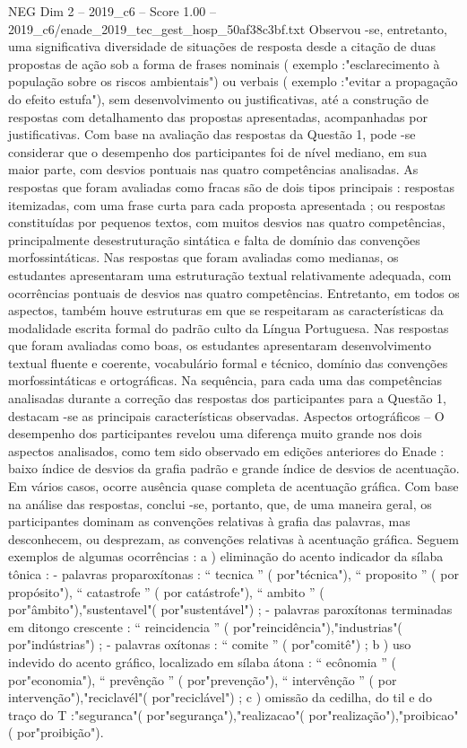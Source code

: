\begin{textsample}{NEG Dim 2 – 2019\_c6 – Score 1.00 – 2019\_c6/enade\_2019\_tec\_gest\_hosp\_50af38c3bf.txt}
Observou -se, entretanto, uma significativa diversidade de situações de resposta desde a citação de duas propostas de ação sob a forma de frases nominais ( exemplo :"esclarecimento à população sobre os riscos ambientais") ou verbais ( exemplo :"evitar a propagação do efeito estufa"), sem desenvolvimento ou justificativas, até a construção de respostas com detalhamento das propostas apresentadas, acompanhadas por justificativas.
Com base na avaliação das respostas da Questão 1, pode -se considerar que o desempenho dos participantes foi de nível mediano, em sua maior parte, com desvios pontuais nas quatro competências analisadas.
As respostas que foram avaliadas como fracas são de dois tipos principais : respostas itemizadas, com uma frase curta para cada proposta apresentada ; ou respostas constituídas por pequenos textos, com muitos desvios nas quatro competências, principalmente desestruturação sintática e falta de domínio das convenções morfossintáticas.
Nas respostas que foram avaliadas como medianas, os estudantes apresentaram uma estruturação textual relativamente adequada, com ocorrências pontuais de desvios nas quatro competências.
Entretanto, em todos os aspectos, também houve estruturas em que se respeitaram as características da modalidade escrita formal do padrão culto da Língua Portuguesa.
Nas respostas que foram avaliadas como boas, os estudantes apresentaram desenvolvimento textual fluente e coerente, vocabulário formal e técnico, domínio das convenções morfossintáticas e ortográficas.
Na sequência, para cada uma das competências analisadas durante a correção das respostas dos participantes para a Questão 1, destacam -se as principais características observadas.
Aspectos ortográficos – O desempenho dos participantes revelou uma diferença muito grande nos dois aspectos analisados, como tem sido observado em edições anteriores do Enade : baixo índice de desvios da grafia padrão e grande índice de desvios de acentuação.
Em vários casos, ocorre ausência quase completa de acentuação gráfica.
Com base na análise das respostas, conclui -se, portanto, que, de uma maneira geral, os participantes dominam as convenções relativas à grafia das palavras, mas desconhecem, ou desprezam, as convenções relativas à acentuação gráfica.
Seguem exemplos de algumas ocorrências : a ) eliminação do acento indicador da sílaba tônica : - palavras proparoxítonas : “ tecnica ” ( por"técnica"), “ proposito ” ( por propósito"), “ catastrofe ” ( por catástrofe"), “ ambito ” ( por"âmbito"),"sustentavel"( por"sustentável") ; - palavras paroxítonas terminadas em ditongo crescente : “ reincidencia ” ( por"reincidência"),"industrias"( por"indústrias") ; - palavras oxítonas : “ comite ” ( por"comitê") ; b ) uso indevido do acento gráfico, localizado em sílaba átona : “ ecônomia ” ( por"economia"), “ prevênção ” ( por"prevenção"), “ intervênção ” ( por intervenção"),"reciclavél"( por"reciclável") ; c ) omissão da cedilha, do til e do traço do T :"seguranca"( por"segurança"),"realizacao"( por"realização"),"proibicao"( por"proibição").

\end{textsample}
